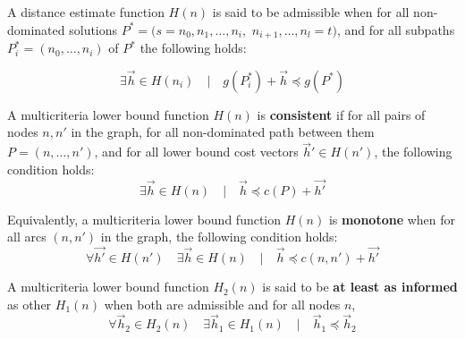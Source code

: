 \begin{defi}\label{chapFormalAnalysis:def:multiObjadmissibleH}
\citep[p. 184]{Mandow2005}
A distance estimate function $H(n)$ is said to be admissible when for all non-dominated solutions $P^*=(s=n_0, n_1, \ldots,n_i,$ $n_{i+1},\ldots,n_l=t)$, and for all subpaths $P_{i}^*=(n_0,\ldots,n_i)$ of $P^*$ the following holds:

\begin{equation}\label{chapFormalAnalysis:eq:multiObjadmissibleH}
\exists \vec h \in H(n_i) \quad | \quad g(P_i^*) + \vec h \preceq g(P^*)
\end{equation}
\end{defi}

\begin{defi}\label{chapFormalAnalysis:def:multiObjconsistentH}
\citep[Definition 5.6]{Mandow2010}
  A multicriteria lower bound function $H(n)$ is \textbf{consistent} if for all pairs of nodes $n, n'$ in the graph, for all non-dominated path between them $P=(n,\ldots,n')$, and for all lower bound cost vectors $\vec h' \in H(n')$, the following condition holds:
\begin{equation}
\exists \vec h \in H(n) \quad | \quad \vec h \preceq c(P) + \vec{h'}  
\end{equation}

\end{defi}

\begin{defi}\label{chapFormalAnalysis:def:multiObjmonotoneH}
\citep[Definition 5.7]{Mandow2010} 
  Equivalently, a multicriteria lower bound function $H(n)$ is \textbf{monotone} when for all arcs $(n, n')$ in the graph, the following condition holds:
\begin{equation}
\forall \vec{h'} \in H(n') \quad \exists \vec h \in H(n) \quad | \quad \vec h \preceq c(n,n') + \vec{h'} 
\end{equation}
\end{defi}

\begin{defi}\label{chapFormalAnalysis:def:multiObjmoreinformedH}
\citep[Definition 5.4]{Mandow2010} A multicriteria lower bound function $H_2(n)$ is said to be \textbf{at least as informed} as other $H_1(n)$ when both are admissible and for all nodes $n$,
\begin{equation}
\forall \vec h_2 \in H_2(n) \quad \exists \vec h_1 \in H_1(n) \quad | \quad \vec h_1 \preceq \vec h_2
\end{equation}
\end{defi}


